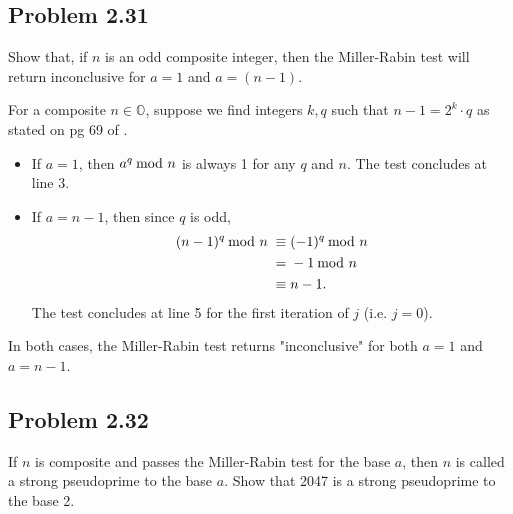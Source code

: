 \documentclass[../hw_sols.tex]{subfiles}
\begin{document}

\subsection*{Problem 2.31}

Show that, if $n$ is an odd composite integer, then the Miller-Rabin test 
will return inconclusive for $a = 1$ and $a = (n - 1)$.

\begin{solution}

For a composite $n \in \mathbb{O}$, suppose we find integers $k,q$ such that 
$n - 1 = 2^k \cdot q$ as stated on pg 69 of \cite{textbook}.

\begin{itemize}

\item If $a = 1$, then $a^q \tmod{n}$ is always 1 for any $q$ and $n$. The 
test concludes at line 3.

\item If $a = n-1$, then since $q$ is odd, 
\begin{align*}
	(n - 1)^q \tmod{n} \; 
	\equiv& \; (-1)^q \tmod{n} \\
	=& \; -1 \tmod{n} \\
	\equiv& \; n - 1.
\end{align*}
The test concludes at line 5 for the first iteration of $j$ (i.e. $j=0$).

\end{itemize}

In both cases, the Miller-Rabin test returns "inconclusive" for both $a = 1$ 
and $a = n - 1$.

\end{solution}



\subsection*{Problem 2.32}

If $n$ is composite and passes the Miller-Rabin test for the base $a$, then 
$n$ is called a strong pseudoprime to the base $a$. Show that 2047 is a 
strong pseudoprime to the base 2.
\end{document}
